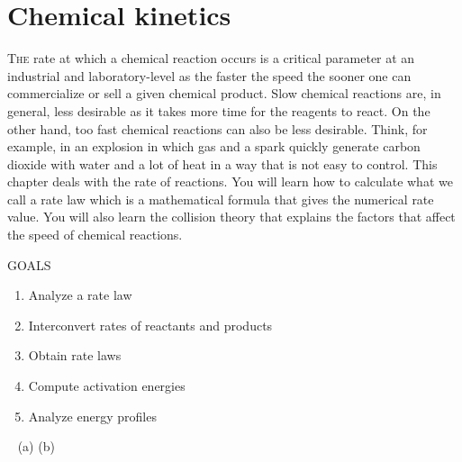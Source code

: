 \documentclass[main.tex]{subfiles}
\begin{document}
\linenumbers
  
\chapter[Chemical kinetics]{Chemical kinetics}


      \begin{marginfigure}
\end{marginfigure}


\lettrine[lines=4]{\color{black!45}T}{he} rate at which a chemical reaction occurs is a critical parameter at an industrial and laboratory-level as the faster the speed the sooner one can commercialize or sell a given chemical product. Slow chemical reactions are, in general, less desirable as it takes more time for the reagents to react. On the other hand, too fast chemical reactions can also be less desirable. Think, for example, in an explosion in which gas and a spark quickly generate carbon dioxide with water and a lot of heat in a way that is not easy to control. This chapter deals with the rate of reactions. You will learn how to calculate what we call a rate law which is a mathematical formula that gives the numerical rate value. You will also learn the collision theory that explains the factors that affect the speed of chemical reactions. 
\begin{marginfigure}%
\begin{mytcbox}{GOALS}
\begin{enumerate}[label=\protect\circled{\color{white}\arabic*}]
\item Analyze a rate law
\item Interconvert rates of reactants and products
\item Obtain rate laws
\item Compute activation energies
\item Analyze energy profiles
\end{enumerate}
\end{mytcbox}
\vspace{1cm}
\begin{tcolorbox}[enhanced,colback=red!5!white,colframe=black!50!red,boxrule=1pt,
  arc=0pt,outer arc=0pt,drop heavy lifted shadow]
\faGears\ 
 (a) \discussionKINETICSA (b) \discussionKINETICS \end{tcolorbox}
\end{marginfigure}%
\end{document}
